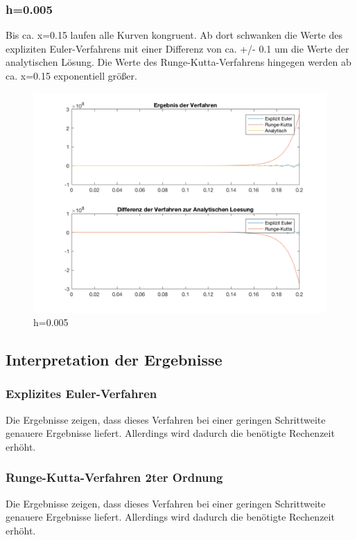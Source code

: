 \documentclass[]{scrartcl}
\begin{document}
\subsubsection{h=0.005}
Bis ca. x=0.15 laufen alle Kurven kongruent. Ab dort schwanken die Werte des expliziten Euler-Verfahrens mit einer Differenz von ca. +/- 0.1 um die Werte der analytischen Lösung. Die Werte des Runge-Kutta-Verfahrens hingegen werden ab ca. x=0.15 exponentiell größer.
\begin{figure}[htbp]
	\centering
	\includegraphics[width=1\linewidth]{a1_1_4}
	\caption{h=0.005}
	\label{fig:a1_1_4}
\end{figure}

\subsection{Interpretation der Ergebnisse}
\subsubsection{Explizites Euler-Verfahren}
Die Ergebnisse zeigen, dass dieses Verfahren bei einer geringen Schrittweite genauere Ergebnisse liefert. Allerdings wird dadurch die benötigte Rechenzeit erhöht.

\subsubsection{Runge-Kutta-Verfahren 2ter Ordnung}
Die Ergebnisse zeigen, dass dieses Verfahren bei einer geringen Schrittweite genauere Ergebnisse liefert. Allerdings wird dadurch die benötigte Rechenzeit erhöht.
\end{document}
